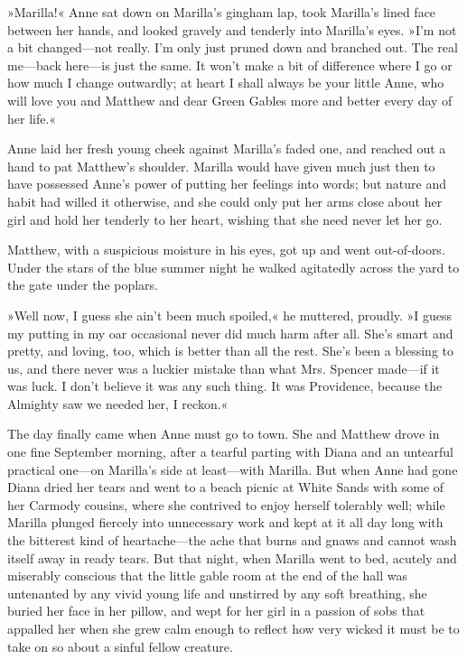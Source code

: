 »Marilla!« Anne sat down on Marilla's gingham lap, took Marilla's lined face between her hands, and looked gravely and tenderly into Marilla's eyes. »I'm not a bit changed—not really. I'm only just pruned down and branched out. The real me—back here—is just the same. It won't make a bit of difference where I go or how much I change outwardly; at heart I shall always be your little Anne, who will love you and Matthew and dear Green Gables more and better every day of her life.«

Anne laid her fresh young cheek against Marilla's faded one, and reached out a hand to pat Matthew's shoulder. Marilla would have given much just then to have possessed Anne's power of putting her feelings into words; but nature and habit had willed it otherwise, and she could only put her arms close about her girl and hold her tenderly to her heart, wishing that she need never let her go.

Matthew, with a suspicious moisture in his eyes, got up and went out-of-doors. Under the stars of the blue summer night he walked agitatedly across the yard to the gate under the poplars.

»Well now, I guess she ain't been much spoiled,« he muttered, proudly. »I guess my putting in my oar occasional never did much harm after all. She's smart and pretty, and loving, too, which is better than all the rest. She's been a blessing to us, and there never was a luckier mistake than what Mrs. Spencer made—if it was luck. I don't believe it was any such thing. It was Providence, because the Almighty saw we needed her, I reckon.«

The day finally came when Anne must go to town. She and Matthew drove in one fine September morning, after a tearful parting with Diana and an untearful practical one—on Marilla's side at least—with Marilla. But when Anne had gone Diana dried her tears and went to a beach picnic at White Sands with some of her Carmody cousins, where she contrived to enjoy herself tolerably well; while Marilla plunged fiercely into unnecessary work and kept at it all day long with the bitterest kind of heartache—the ache that burns and gnaws and cannot wash itself away in ready tears. But that night, when Marilla went to bed, acutely and miserably conscious that the little gable room at the end of the hall was untenanted by any vivid young life and unstirred by any soft breathing, she buried her face in her pillow, and wept for her girl in a passion of sobs that appalled her when she grew calm enough to reflect how very wicked it must be to take on so about a sinful fellow creature.

